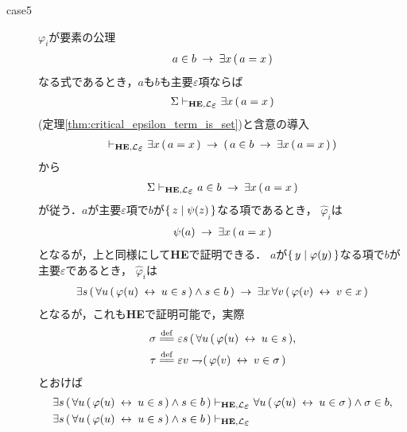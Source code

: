 \begin{metaprf}
\begin{description}
			\item[case5] $\varphi_{i}$が要素の公理
				\begin{align}
					a \in b \hspace{0.25em}\rightarrow\hspace{0.25em} \exists x\, (\, a = x\, )
				\end{align}
				なる式であるとき，$a$も$b$も主要$\varepsilon$項ならば
				\begin{align}
					\Sigma \provable{\mbox{{\bf HE}},\lang{\varepsilon}} \exists x\, (\, a = x\, )
				\end{align}
				(定理\ref{thm:critical_epsilon_term_is_set})と含意の導入
				\begin{align}
					\provable{\mbox{{\bf HE}},\lang{\varepsilon}} \exists x\, (\, a = x\, )
					\rarrow (\, a \in b \rarrow \exists x\, (\, a = x\, )\, )
				\end{align}
				から
				\begin{align}
					\Sigma \provable{\mbox{{\bf HE}},\lang{\varepsilon}} a \in b \rarrow \exists x\, (\, a = x\, )
				\end{align}
				が従う．$a$が主要$\varepsilon$項で$b$が$\{\, z \mid \psi(z)\, \}$なる項であるとき，
				$\widehat{\varphi}_{i}$は
				\begin{align}
					\psi(a) \hspace{0.25em}\rightarrow\hspace{0.25em} \exists x\, (\, a = x\, )
				\end{align}
				となるが，上と同様にして{\bf HE}で証明できる．
				$a$が$\{\, y \mid \varphi(y)\, \}$なる項で$b$が主要$\varepsilon$であるとき，
				$\widehat{\varphi}_{i}$は
				\begin{align}
					\exists s\, (\, \forall u\, (\, \varphi(u) \hspace{0.25em}\leftrightarrow\hspace{0.25em} u \in s\, )
					\wedge s \in b\, ) \hspace{0.25em}\rightarrow\hspace{0.25em} \exists x\, \forall v\, (\, \varphi(v) \hspace{0.25em}\leftrightarrow\hspace{0.25em} v \in x\, )
				\end{align}
				となるが，これも{\bf HE}で証明可能で，実際
				\begin{align}
					\sigma &\defeq \varepsilon s\, (\, \forall u\, (\, \varphi(u) \lrarrow u \in s\, ), \\
					\tau &\defeq \varepsilon v \negation (\, \varphi(v) \lrarrow v \in \sigma\, )
				\end{align}
				とおけば
				\begin{align}
					\exists s\, (\, \forall u\, (\, \varphi(u) \lrarrow u \in s\, )
					\wedge s \in b\, )
					&\provable{\mbox{{\bf HE}},\lang{\varepsilon}} 
					\forall u\, (\, \varphi(u) \lrarrow u \in \sigma\, )
					\wedge \sigma \in b, \\
					\exists s\, (\, \forall u\, (\, \varphi(u) \lrarrow u \in s\, )
					\wedge s \in b\, )
					&\provable{\mbox{{\bf HE}},\lang{\varepsilon}} 

\end{align}
\end{description}
\end{metaprf}
